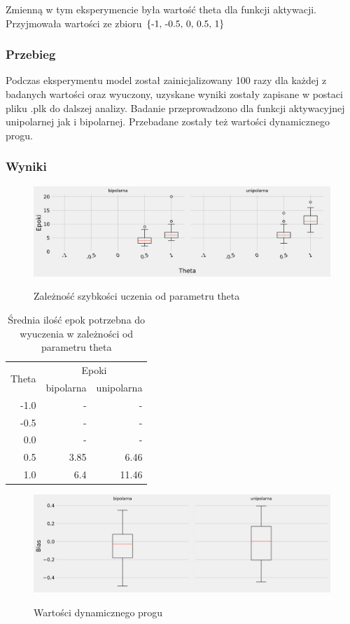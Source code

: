 \documentclass{article}
\begin{document}
Zmienną w tym eksperymencie była wartość theta dla funkcji aktywacji. Przyjmowała wartości ze zbioru \(\{$-1, -0.5, 0, 0.5, 1$\}\)
\subsubsection*{Przebieg}

Podczas eksperymentu model został zainicjalizowany 100 razy dla każdej z badanych wartości oraz wyuczony, uzyskane wyniki zostały zapisane w postaci pliku .plk do dalszej analizy. Badanie przeprowadzono dla funkcji aktywacyjnej unipolarnej jak i bipolarnej. Przebadane zostały też wartości dynamicznego progu.

\subsubsection*{Wyniki}
\begin{figure}[!h]
	\centering
	\caption{Zależność szybkości uczenia od parametru theta}
	\includegraphics[width=\textwidth]{per_theta.png}
	\label{fig:res11}
\end{figure}

\begin{table}[!h]
	\caption{Średnia ilość epok potrzebna do wyuczenia w zależności od parametru theta}
	\label{tabela-res-11}
	\centering
	\begin{tabular}{rrr}
		\toprule
		\multirow{2}{*}{Theta}   & \multicolumn{2}{c}{Epoki} \\
		     & bipolarna & unipolarna \\
		\midrule
		-1.0 & -         & -          \\
		-0.5 & -         & -          \\
		0.0  & -         & -          \\
		0.5  & 3.85      & 6.46       \\
		1.0  & 6.4       & 11.46      \\
		\bottomrule
	\end{tabular}
\end{table}

\begin{figure}[!h]
	\centering
	\caption{Wartości dynamicznego progu}
	\includegraphics[width=\textwidth]{per_bias.png}
	\label{fig:res12}
\end{figure}
\end{document}
